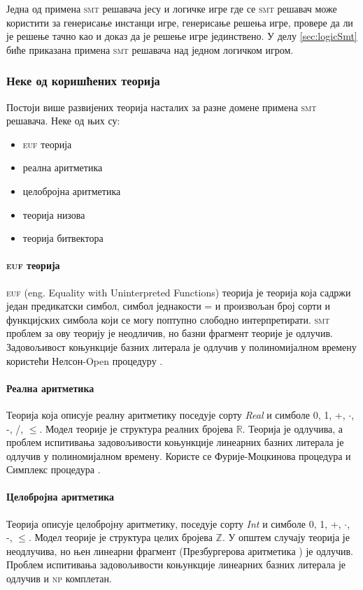 \documentclass[a4paper]{article}
\begin{document}
Једна од примена \textsc{smt} решавача јесу и логичке игре где се \textsc{smt} решавач може користити за генерисање инстанци игре,
генерисање решења игре, провере да ли је решење тачно као и доказ да је решење игре јединствено. У делу
\ref{sec:logicSmt} биће приказана примена \textsc{smt} решавача над једном логичком игром.


\subsubsection{Неке од коришћених теорија}
\label{subsubsec:theories}

Постоји више развијених теорија насталих за разне домене примена \textsc{smt} решавача.
Неке од њих су:
\begin{itemize}
    \item \textsc{euf} теорија
    \item реална аритметика
    \item целобројна аритметика
    \item теорија низова
    \item теорија битвектора
\end{itemize}

\paragraph{\textsc{euf} теорија} \textsc{euf} (eng. Equality with Uninterpreted Functions) теорија је теорија која садржи
један предикатски симбол, симбол једнакости = и произвољан број сорти
и функцијских симбола који се могу поптупно слободно интерпретирати.
\textsc{smt} проблем за ову теорију је неодличив, но базни фрагмент теорије је одлучив. Задовољивост коњункције базних литерала
је одлучив у полиномијалном времену користећи Нелсон-Open процедуру \cite{handbookar}.


\paragraph{Реална аритметика} Теорија која описује реалну аритметику поседује сорту \emph{Real} и симболе
0, 1, +, $\cdot$, -, /, $\leq$. Модел теорије је структура реалних бројева $\mathbb{R}$. Теорија је одлучива,
а проблем испитивања задовољивости коњункције линеарних базних литерала је одлучив у полиномијалном времену.
Користе се Фурије-Моцкинова процедура \cite{handbookar} и Симплекс процедура \cite{lp}.

\paragraph{Целобројна аритметика} Теорија описује целобројну аритметику, поседује сорту \emph{Int} и симболе
0, 1, +, $\cdot$, -, $\leq$. Модел теорије је структура целих бројева $\mathbb{Z}$. У општем случају теорија је
неодлучива, но њен линеарни фрагмент (Презбургерова аритметика \cite{handbookar}) је одлучив. Проблем испитивања
задовољивости коњункције линеарних базних литерала је одлучив и \textsc{np} комплетан.
\end{document}
